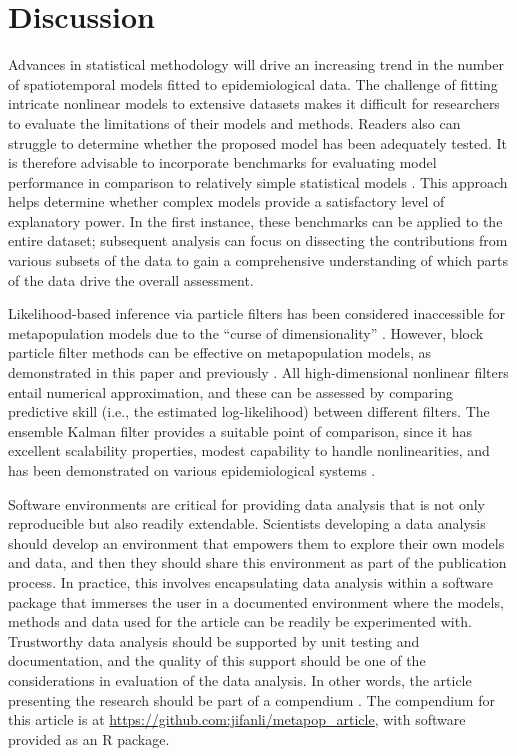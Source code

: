 \documentclass[12pt]{article}\usepackage[]{graphicx}\usepackage[]{xcolor}
\begin{document}
\section{Discussion}
\label{sec:conclusion}

Advances in statistical methodology will drive an increasing trend in the number of spatiotemporal models fitted to epidemiological data.
The challenge of fitting intricate nonlinear models to extensive datasets makes it difficult for researchers to evaluate the limitations of their models and methods.
Readers also can struggle to determine whether the proposed model has been adequately tested.
It is therefore advisable to incorporate benchmarks for evaluating model performance in comparison to relatively simple statistical models \citep{he10}.
This approach helps determine whether complex models provide a satisfactory level of explanatory power.
In the first instance, these benchmarks can be applied to the entire dataset; subsequent analysis can focus on dissecting the contributions from various subsets of the data to gain a comprehensive understanding of which parts of the data drive the overall assessment.

Likelihood-based inference via particle filters has been considered inaccessible for metapopulation models due to the ``curse of dimensionality'' \cite{bengtsson08}.
However, block particle filter methods can be effective on metapopulation models, as demonstrated in this paper and previously \cite{ionides21,ning23,wheeler23}.
All high-dimensional nonlinear filters entail numerical approximation, and these can be assessed by comparing predictive skill (i.e., the estimated log-likelihood) between different filters.
The ensemble Kalman filter provides a suitable point of comparison, since it has excellent scalability properties, modest capability to handle nonlinearities, and has been demonstrated on various epidemiological systems \cite{shaman12,yang14,yang15,pei18,yang21,kramer20-plos-cb,cascante-vega22}.

Software environments are critical for providing data analysis that is not only reproducible but also readily extendable.
Scientists developing a data analysis should develop an environment that empowers them to explore their own models and data, and then they should share this environment as part of the publication process.
In practice, this involves encapsulating data analysis within a software package  that immerses the user in a documented environment where the models, methods and data used for the article can be readily be experimented with.
Trustworthy data analysis should be supported by unit testing and documentation, and the quality of this support should be one of the considerations in evaluation of the data analysis.
In other words, the article presenting the research should be part of a compendium \cite{gentleman07}.
The compendium for this article is at \url{https://github.com:jifanli/metapop_article}, with software provided as an R package.
\end{document}
